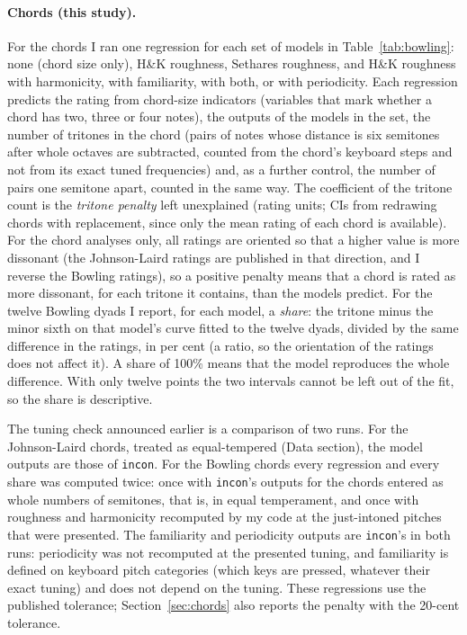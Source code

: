 \documentclass[11pt,a4paper]{article}
\newcommand{\HK}{H\&K}
\begin{document}
\paragraph{Chords (this study).}
For the chords I ran one regression for each set of models in Table~\ref{tab:bowling}: none (chord
size only), \HK{} roughness, Sethares roughness, and \HK{} roughness with harmonicity, with
familiarity, with both, or with periodicity. Each regression predicts the rating from
chord-size indicators (variables that mark whether a chord has two, three or four notes),
the outputs of the models in the set, the number of tritones in the chord (pairs of notes
whose distance is six semitones after whole octaves are subtracted, counted from the chord's
keyboard steps and not from its exact tuned frequencies) and, as a further control, the
number of pairs one semitone apart, counted in the same way. The coefficient of the tritone
count is the \emph{tritone penalty} left unexplained (rating units; CIs from redrawing chords with replacement, since only the mean rating of each chord is available). For the chord analyses only, all ratings are oriented so that a higher value is more
dissonant (the Johnson-Laird ratings are published in that direction, and I reverse the Bowling ratings), so a positive penalty means that a chord is rated as more dissonant, for each
tritone it contains, than the models predict. For the twelve Bowling dyads I report, for each model, a
\emph{share}: the tritone minus the minor sixth on that model's curve fitted to
the twelve dyads, divided by the same difference in the ratings, in per cent (a ratio, so the orientation of the ratings does not affect it). A share of 100\% means
that the model reproduces the whole difference. With only twelve points the two intervals
cannot be left out of the fit, so the share is descriptive.

The tuning check announced earlier is a comparison of two runs. For the Johnson-Laird chords, treated as equal-tempered (Data section), the model outputs are those of \texttt{incon}. For the Bowling chords
every regression and every share was computed twice: once with \texttt{incon}'s outputs for
the chords entered as whole numbers of semitones, that is, in equal temperament, and once
with roughness and harmonicity recomputed by my code at the just-intoned pitches that were
presented. The familiarity and periodicity outputs are \texttt{incon}'s in both runs: periodicity was
not recomputed at the presented tuning, and familiarity is defined on keyboard pitch categories (which keys are pressed, whatever their exact tuning) and does not depend on the tuning. These regressions use the published tolerance; Section~\ref{sec:chords} also reports the penalty with the 20-cent tolerance.
\end{document}
